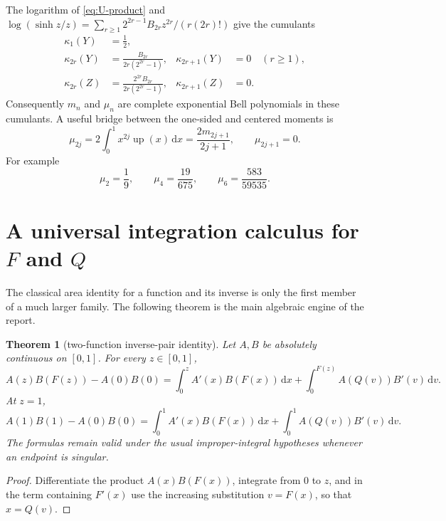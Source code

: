\documentclass[11pt,oneside]{article}
\newtheorem{theorem}{Theorem}[section]
\theoremstyle{definition}
\newcommand{\F}{F}
\newcommand{\Q}{Q}
\newcommand{\upf}{\operatorname{up}}
\newcommand{\dd}{\,\mathrm d}
\begin{document}
The logarithm of \cref{eq:U-product} and
\(
 \log(\sinh z/z)
 =\sum_{r\ge1}2^{2r-1}B_{2r}z^{2r}/(r(2r)!)
\)
give the cumulants
\begin{align}
 \kappa_1(Y)&=\frac12,\nonumber\\
 \kappa_{2r}(Y)&=\frac{B_{2r}}{2r(2^{2r}-1)},
 &\kappa_{2r+1}(Y)&=0\quad(r\ge1),\label{eq:Y-cumulants}\\
 \kappa_{2r}(Z)&=\frac{2^{2r}B_{2r}}{2r(2^{2r}-1)},
 &\kappa_{2r+1}(Z)&=0.\label{eq:Z-cumulants}
\end{align}
Consequently \(m_n\) and \(\mu_n\) are complete exponential Bell polynomials in
these cumulants.  A useful bridge between the one-sided and centered moments is
\begin{equation}\label{eq:mu-m-relation}
 \mu_{2j}
 =2\int_0^1x^{2j}\upf(x)\dd x
 =\frac{2m_{2j+1}}{2j+1},
 \qquad \mu_{2j+1}=0.
\end{equation}
For example
\begin{equation}\label{eq:first-central-moments}
 \mu_2=\frac19,\qquad
 \mu_4=\frac{19}{675},\qquad
 \mu_6=\frac{583}{59535}.
\end{equation}

\section{A universal integration calculus for \texorpdfstring{\(\F\)}{F} and
\texorpdfstring{\(\Q\)}{Q}}

The classical area identity for a function and its inverse is only the first member of
a much larger family.  The following theorem is the main algebraic engine of the report.

\begin{theorem}[two-function inverse-pair identity]\label{thm:AB}
Let \(A,B\) be absolutely continuous on \([0,1]\).  For every \(z\in[0,1]\),
\begin{equation}\label{eq:AB-incomplete}
 A(z)B(\F(z))-A(0)B(0)
 =\int_0^z A'(x)B(\F(x))\dd x
 +\int_0^{\F(z)}A(\Q(v))B'(v)\dd v.
\end{equation}
At \(z=1\),
\begin{equation}\label{eq:AB-complete}
 A(1)B(1)-A(0)B(0)
 =\int_0^1A'(x)B(\F(x))\dd x
 +\int_0^1A(\Q(v))B'(v)\dd v.
\end{equation}
The formulas remain valid under the usual improper-integral hypotheses whenever an
endpoint is singular.
\end{theorem}

\begin{proof}
Differentiate the product \(A(x)B(\F(x))\), integrate from \(0\) to \(z\), and in
the term containing \(\F'(x)\) use the increasing substitution \(v=\F(x)\),
so that \(x=\Q(v)\).
\end{proof}
\end{document}
